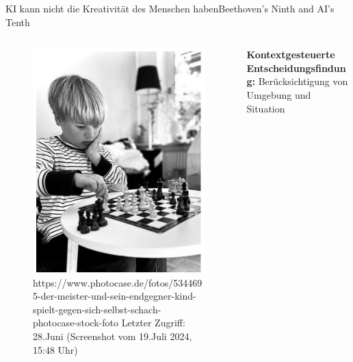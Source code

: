 \documentclass[169,9pt]{beamer}
\begin{document}
\begin{frame}{KI kann nicht die Kreativität des Menschen haben}{Beethoven's Ninth and AI's Tenth}
\begin{columns}
    \begin{column}{0.45\textwidth}
        \begin{figure}[h]
            \centering
            \includegraphics[width=1.0\textwidth]{Bildschirmfoto vom 2024-07-19 19-31-37.png}
            \caption{\smaller \smaller \smaller \smaller \smaller https://www.photocase.de/fotos/5344695-der-meister-und-sein-endgegner-kind-spielt-gegen-sich-selbst-schach-photocase-stock-foto \newline Letzter Zugriff: 28.Juni (Screenshot vom 19.Juli 2024, 15:48 Uhr)}
            \label{fig:my_label}
        \end{figure}
    \end{column}
    \begin{column}{0.45\textwidth}
        \textbf{Kontextgesteuerte Entscheidungsfindung:} Berücksichtigung von Umgebung und Situation
    \end{column}
\end{columns}
\end{frame}
\end{document}
